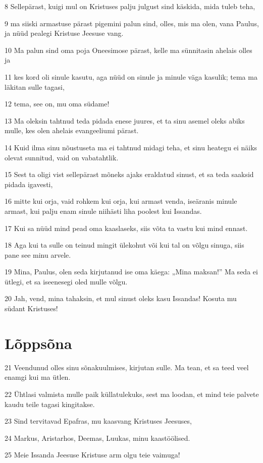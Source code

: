 \par 8 Sellepärast, kuigi mul on Kristuses palju julgust sind käskida, mida tuleb teha,
\par 9 ma siiski armastuse pärast pigemini palun sind, olles, mis ma olen, vana Paulus, ja nüüd pealegi Kristuse Jeesuse vang.
\par 10 Ma palun sind oma poja Oneesimose pärast, kelle ma sünnitasin ahelais olles ja
\par 11 kes kord oli sinule kasutu, aga nüüd on sinule ja minule väga kasulik; tema ma läkitan sulle tagasi,
\par 12 tema, see on, mu oma südame!
\par 13 Ma oleksin tahtnud teda pidada enese juures, et ta sinu asemel oleks abiks mulle, kes olen ahelais evangeeliumi pärast.
\par 14 Kuid ilma sinu nõustuseta ma ei tahtnud midagi teha, et sinu heategu ei näiks olevat sunnitud, vaid on vabatahtlik.
\par 15 Sest ta oligi vist sellepärast mõneks ajaks eraldatud sinust, et sa teda saaksid pidada igavesti,
\par 16 mitte kui orja, vaid rohkem kui orja, kui armast venda, iseäranis minule armast, kui palju enam sinule niihästi liha poolest kui Issandas.
\par 17 Kui sa nüüd mind pead oma kaaslaseks, siis võta ta vastu kui mind ennast.
\par 18 Aga kui ta sulle on teinud mingit ülekohut või kui tal on võlgu sinuga, siis pane see minu arvele.
\par 19 Mina, Paulus, olen seda kirjutanud ise oma käega: „Mina maksan!” Ma seda ei ütlegi, et sa iseenesegi oled mulle võlgu.
\par 20 Jah, vend, mina tahaksin, et mul sinust oleks kasu Issandas! Kosuta mu südant Kristuses!

\section*{Lõppsõna}

\par 21 Veendunud olles sinu sõnakuulmises, kirjutan sulle. Ma tean, et sa teed veel enamgi kui ma ütlen.
\par 22 Ühtlasi valmista mulle paik küllatulekuks, sest ma loodan, et mind teie palvete kaudu teile tagasi kingitakse.
\par 23 Sind tervitavad Epafras, mu kaasvang Kristuses Jeesuses,
\par 24 Markus, Aristarhos, Deemas, Luukas, minu kaastöölised.
\par 25 Meie Issanda Jeesuse Kristuse arm olgu teie vaimuga!




